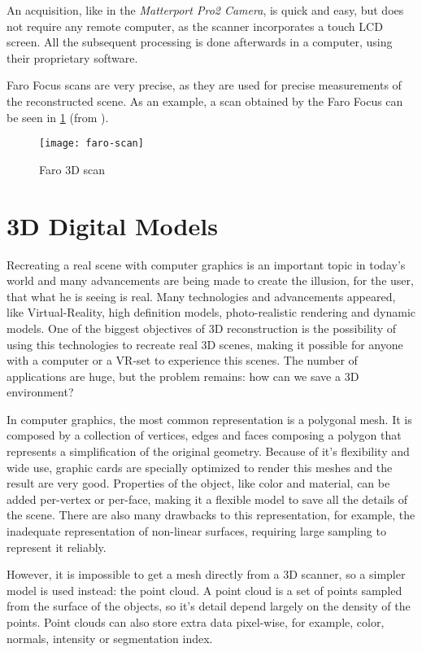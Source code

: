 An acquisition, like in the \emph{Matterport Pro2 Camera}, is quick and easy, but does not require any remote computer, as the scanner incorporates a touch LCD screen. All the subsequent processing is done afterwards in a computer, using their proprietary software.

Faro Focus scans are very precise, as they are used for precise measurements of the reconstructed scene. As an example, a scan obtained by the Faro Focus can be seen in \cref{fig:faro-scan} (from \cite{faro-scan}).

\begin{figure}[h]
    \centering
    \texttt{[image: faro-scan]}
    \caption{Faro 3D scan}
    \label{fig:faro-scan}
    
\end{figure}

\section{3D Digital Models}

Recreating a real scene with computer graphics is an important topic in today's world and many advancements are being made to create the illusion, for the user, that what he is seeing is real. Many technologies and advancements appeared, like Virtual-Reality, high definition models, photo-realistic rendering and dynamic models. One of the biggest objectives of 3D reconstruction is the possibility of using this technologies to recreate real 3D scenes, making it possible for anyone with a computer or a VR-set to experience this scenes. The number of applications are huge, but the problem remains: how can we save a 3D environment?

In computer graphics, the most common representation is a polygonal mesh. It is composed by a collection of vertices, edges and faces composing a polygon that represents a simplification of the original geometry. Because of it's flexibility and wide use, graphic cards are specially optimized to render this meshes and the result are very good. Properties of the object, like color and material, can be added per-vertex or per-face, making it a flexible model to save all the details of the scene. There are also many drawbacks to this representation, for example, the inadequate representation of non-linear surfaces, requiring large sampling to represent it reliably.

However, it is impossible to get a mesh directly from a 3D scanner, so a simpler model is used instead: the point cloud. A point cloud is a set of points sampled from the surface of the objects, so it's detail depend largely on the density of the points. Point clouds can also store extra data pixel-wise, for example, color, normals, intensity or segmentation index.

